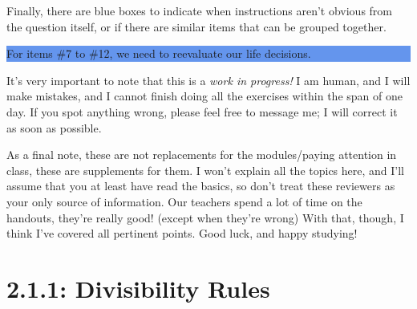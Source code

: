 \documentclass{article}
\begin{document}
\par
Finally, there are blue boxes to indicate when instructions aren't obvious from the question itself, or if there are similar items that can be grouped together.\par
\parindent=25pt 
    \colorbox{CornflowerBlue}{
    \begin{minipage}[c]{0.9\textwidth}
        \centering
        For items \#7 to \#12, we need to reevaluate our life decisions.
    \end{minipage}
    }\parindent=0pt \par 
It's very important to note that this is a \textit{work in progress!} I am human, and I will make mistakes, and I cannot finish doing all the exercises within the span of one day. If you spot anything wrong, 
please feel free to message me; I will correct it as soon as possible.\par
As a final note, these are not replacements for the modules/paying attention in class, these are supplements for them. I won't explain all the topics here, and I'll assume that you at least have 
read the basics, so don't treat these reviewers as your only source of information. Our teachers spend a lot of time on the handouts, they're really good! (except when they're wrong) With that, though, I think 
I've covered all pertinent points. Good luck, and happy studying!
\pagebreak 

\section*{2.1.1: Divisibility Rules}
\end{document}
